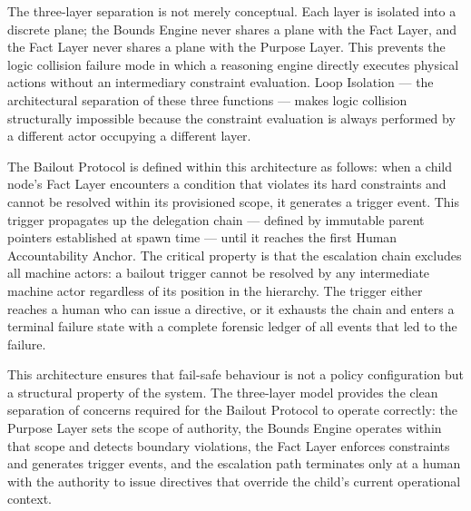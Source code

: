 The three-layer separation is not merely conceptual. Each layer is isolated into a discrete plane; the Bounds Engine never shares a plane with the Fact Layer, and the Fact Layer never shares a plane with the Purpose Layer. This prevents the logic collision failure mode in which a reasoning engine directly executes physical actions without an intermediary constraint evaluation. Loop Isolation — the architectural separation of these three functions — makes logic collision structurally impossible because the constraint evaluation is always performed by a different actor occupying a different layer.

The Bailout Protocol is defined within this architecture as follows: when a child node's Fact Layer encounters a condition that violates its hard constraints and cannot be resolved within its provisioned scope, it generates a trigger event. This trigger propagates up the delegation chain — defined by immutable parent pointers established at spawn time — until it reaches the first Human Accountability Anchor. The critical property is that the escalation chain excludes all machine actors: a bailout trigger cannot be resolved by any intermediate machine actor regardless of its position in the hierarchy. The trigger either reaches a human who can issue a directive, or it exhausts the chain and enters a terminal failure state with a complete forensic ledger of all events that led to the failure.

This architecture ensures that fail-safe behaviour is not a policy configuration but a structural property of the system. The three-layer model provides the clean separation of concerns required for the Bailout Protocol to operate correctly: the Purpose Layer sets the scope of authority, the Bounds Engine operates within that scope and detects boundary violations, the Fact Layer enforces constraints and generates trigger events, and the escalation path terminates only at a human with the authority to issue directives that override the child's current operational context.